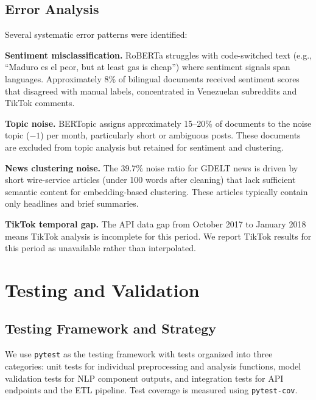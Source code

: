 \documentclass[12pt, letterpaper]{article}
\begin{document}
\subsection{Error Analysis}

Several systematic error patterns were identified:

\textbf{Sentiment misclassification.} RoBERTa struggles with code-switched text (e.g., ``Maduro es el peor, but at least gas is cheap'') where sentiment signals span languages. Approximately 8\% of bilingual documents received sentiment scores that disagreed with manual labels, concentrated in Venezuelan subreddits and TikTok comments.

\textbf{Topic noise.} BERTopic assigns approximately 15--20\% of documents to the noise topic ($-1$) per month, particularly short or ambiguous posts. These documents are excluded from topic analysis but retained for sentiment and clustering.

\textbf{News clustering noise.} The 39.7\% noise ratio for GDELT news is driven by short wire-service articles (under 100 words after cleaning) that lack sufficient semantic content for embedding-based clustering. These articles typically contain only headlines and brief summaries.

\textbf{TikTok temporal gap.} The API data gap from October 2017 to January 2018 means TikTok analysis is incomplete for this period. We report TikTok results for this period as unavailable rather than interpolated.

\section{Testing and Validation}
\label{sec:testing}

\subsection{Testing Framework and Strategy}

We use \texttt{pytest} as the testing framework with tests organized into three categories: unit tests for individual preprocessing and analysis functions, model validation tests for NLP component outputs, and integration tests for API endpoints and the ETL pipeline. Test coverage is measured using \texttt{pytest-cov}.
\end{document}
